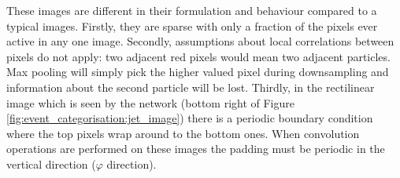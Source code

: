 These images are different in their formulation and behaviour compared to a typical images.
Firstly, they are sparse with only a fraction of the pixels ever active in any one image. 
Secondly, assumptions about local correlations between pixels do not apply: two adjacent red pixels would mean two adjacent particles. Max pooling will simply pick the higher valued pixel during downsampling and information about the second particle will be lost. 
Thirdly, in the rectilinear image which is seen by the network (bottom right of Figure \ref{fig:event_categorisation:jet_image}) there is a periodic boundary condition where the top pixels wrap around to the bottom ones. When convolution operations are performed on these images the padding must be periodic in the vertical direction ($\varphi$ direction).






